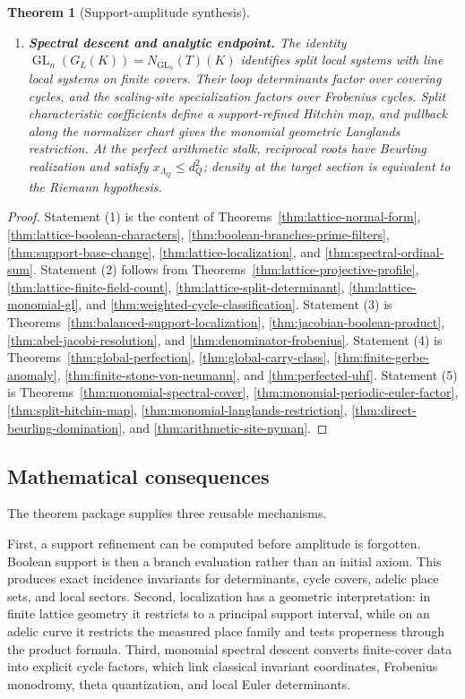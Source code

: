 \documentclass[11pt]{amsart}
\numberwithin{equation}{section}
\newtheorem{theorem}{Theorem}[section]
\theoremstyle{definition}
\newcommand{\GL}{\operatorname{GL}}
\begin{document}
\begin{theorem}[Support-amplitude synthesis]
\begin{enumerate}[label=\textup{(\arabic*)},leftmargin=3.2em]
\item \textbf{Spectral descent and analytic endpoint.}
The identity
$\GL_n(G_L(K))=N_{\GL_n}(T)(K)$ identifies split local systems with line
local systems on finite covers.  Their loop determinants factor over
covering cycles, and the scaling-site specialization factors over
Frobenius cycles.  Split characteristic coefficients define a
support-refined Hitchin map, and pullback along the normalizer chart gives
the monomial geometric Langlands restriction.  At the perfect arithmetic
stalk, reciprocal roots have Beurling realization and satisfy
$x_{\Lambda_Q}\le d_Q^2$; density at the target section is equivalent to
the Riemann hypothesis.
\end{enumerate}
\end{theorem}

\begin{proof}
Statement (1) is the content of
Theorems~\ref{thm:lattice-normal-form},
\ref{thm:lattice-boolean-characters},
\ref{thm:boolean-branches-prime-filters},
\ref{thm:support-base-change},
\ref{thm:lattice-localization}, and
\ref{thm:spectral-ordinal-sum}.  Statement (2) follows from
Theorems~\ref{thm:lattice-projective-profile},
\ref{thm:lattice-finite-field-count},
\ref{thm:lattice-split-determinant},
\ref{thm:lattice-monomial-gl}, and
\ref{thm:weighted-cycle-classification}.  Statement (3) is
Theorems~\ref{thm:balanced-support-localization},
\ref{thm:jacobian-boolean-product},
\ref{thm:abel-jacobi-resolution}, and
\ref{thm:denominator-frobenius}.  Statement (4) is
Theorems~\ref{thm:global-perfection},
\ref{thm:global-carry-class},
\ref{thm:finite-gerbe-anomaly},
\ref{thm:finite-stone-von-neumann}, and
\ref{thm:perfected-uhf}.  Statement (5) is
Theorems~\ref{thm:monomial-spectral-cover},
\ref{thm:monomial-periodic-euler-factor},
\ref{thm:split-hitchin-map},
\ref{thm:monomial-langlands-restriction},
\ref{thm:direct-beurling-domination}, and
\ref{thm:arithmetic-site-nyman}.
\end{proof}

\subsection*{Mathematical consequences}

The theorem package supplies three reusable mechanisms.

First, a support refinement can be computed before amplitude is forgotten.  Boolean support is then a branch evaluation rather than an initial axiom.  
This produces exact incidence invariants for determinants, cycle covers,
adelic place sets, and local sectors.  Second, localization has a geometric
interpretation: in finite lattice geometry it restricts to a principal
support interval, while on an adelic curve it restricts the measured place
family and tests properness through the product formula.  Third, monomial
spectral descent converts finite-cover data into explicit cycle factors,
which link classical invariant coordinates, Frobenius monodromy, theta
quantization, and local Euler determinants.
\end{document}

